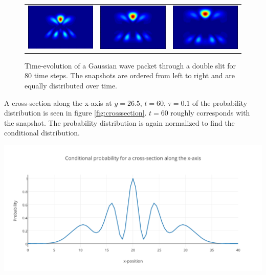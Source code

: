 \begin{figure}[H]
\begin{tabular}{ccc}
  \includegraphics[scale = 0.29]{slit10.png} &   \includegraphics[scale = 0.29]{slit11.png} &   \includegraphics[scale = 0.29]{slit12.png} \\
\end{tabular}
\caption{Time-evolution of a Gaussian wave packet through a double slit for 80 time steps. The snapshots are ordered from left to right and are equally distributed over time.}
\label{fig:doubleslit}
\end{figure}A cross-section along the x-axis at $y = 26.5$, $t = 60$, $\tau = 0.1$ of the probability distribution is seen in figure \ref{fig:crosssection}. $t = 60$ roughly corresponds with the  snapshot. The probability distribution is again normalized to find the conditional distribution.
\begin{Figure}
    \centerfloat
    \includegraphics[trim = 3.5mm 0mm 3.5mm 0mm, clip,scale = 0.435]{crosssectiondoubleslit.pdf}
    \label{fig:crosssection}
\end{Figure}
